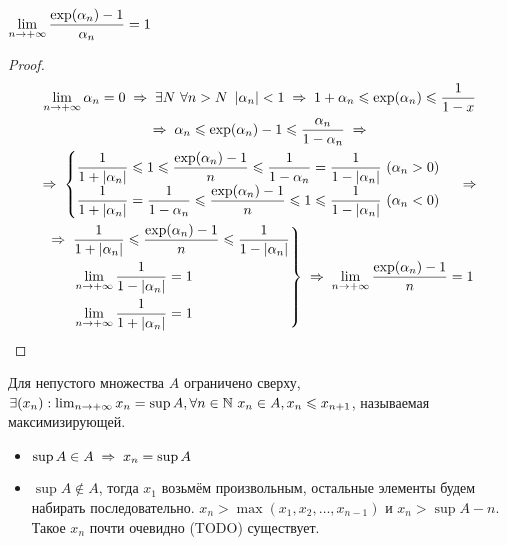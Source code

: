 \begin{theorem}
    $\displaystyle \lim_{n\to+\infty} \frac{\exp(\alpha_n) - 1}{\alpha_n} = 1$
\end{theorem}
\begin{proof}
    \begin{multline*}
        \limpinf \alpha_n = 0 \thus
        \exists N\ \forall n > N\ \abs{\alpha_n} < 1 \thus 1 + \alpha_n \le \exp(\alpha_n) \le \frac{1}{1 - x} \\
        \thus \alpha_n \le \exp(\alpha_n) - 1 \le \frac{\alpha_n}{1 - \alpha_n} \thus \\
        \thus
        \begin{cases}
            \dfrac{1}{1 + \abs{\alpha_n}} \le 1 \le \dfrac{\exp(\alpha_n) - 1}{n} \le \dfrac{1}{1 - \alpha_n} = \dfrac{1}{1 - \abs{\alpha_n}}\ (\alpha_n > 0) \\
            \dfrac{1}{1 + \abs{\alpha_n}} = \dfrac{1}{1 - \alpha_n} \le \dfrac{\exp(\alpha_n) - 1}{n} \le 1 \le \dfrac{1}{1 - \abs{\alpha_n}}\ (\alpha_n < 0)
        \end{cases}
        \thus \\
        \begin{rcases}
            \thus \dfrac{1}{1 + \abs{\alpha_n}} \le \dfrac{\exp(\alpha_n) - 1}{n} \le \dfrac{1}{1 - \abs{\alpha_n}} \\
            \phantom{\thus{ }} \displaystyle \limpinf \frac{1}{1 - \abs{\alpha_n}} = 1 \\
            \phantom{\thus{ }} \displaystyle \limpinf \frac{1}{1 + \abs{\alpha_n}} = 1
        \end{rcases} \thus \limpinf \frac{\exp(\alpha_n) - 1}{n} = 1
    \end{multline*}
\end{proof}


Для непустого множества $A$ ограничено сверху, $\exists (x_n) : \lim_{n\to+\infty} x_n = \sup{A}, \forall n \in \mathbb{N}\ x_n \in A, x_n \leqslant x_{n + 1}$, называемая максимизирующей.

\begin{itemize}
    \item $\sup{A} \in A \thus x_n = \sup{A}$
    \item $\sup{A} \notin A$, тогда $x_1$ возьмём произвольным, остальные элементы будем набирать последовательно. $x_n > \max(x_1, x_2, \ldots, x_{n - 1})$ и $x_n > \sup{A} - n$. Такое $x_n$ почти очевидно (TODO) существует.
\end{itemize}


